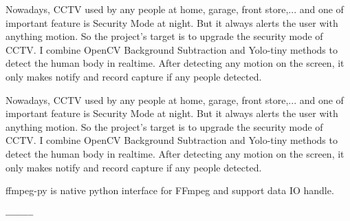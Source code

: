 \documentclass[10pt,a4paper,ragged2e,withhyper]{altacv}
\begin{document}
\medskip

\divider

\medskip

\begin{minipage}{\linewidth}
\justifying
Nowadays, CCTV used by any people at home, garage, front store,... and one of important feature is Security Mode at night. But it always alerts the user with anything motion. So the project's target is to upgrade the security mode of CCTV. I combine OpenCV Background Subtraction and Yolo-tiny methods to detect the human body in realtime. After detecting any motion on the screen, it only makes notify and record capture if any people detected.
\end{minipage}

\medskip

\divider

\medskip

\begin{minipage}{\linewidth}
	\justifying
	Nowadays, CCTV used by any people at home, garage, front store,... and one of important feature is Security Mode at night. But it always alerts the user with anything motion. So the project's target is to upgrade the security mode of CCTV. I combine OpenCV Background Subtraction and Yolo-tiny methods to detect the human body in realtime. After detecting any motion on the screen, it only makes notify and record capture if any people detected.
\end{minipage}

\medskip

\divider

\medskip

\begin{minipage}{\linewidth}
	\justifying
	ffmpeg-py is native python interface for FFmpeg and support data IO handle.
	
\end{minipage}

\bigskip
\begin{minipage}{\linewidth}
	\centering
	\textbf{\color{accent}--------}
\end{minipage}
	
\end{document}
